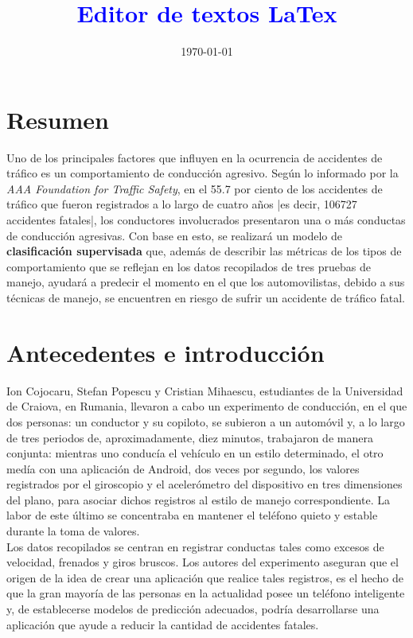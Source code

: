 \documentclass[spanish,12pt,letterpaper]{article}
\title{\textcolor{blue}{Editor de textos LaTex}}
\date{\today}
\begin{document}
\tableofcontents
\listoffigures
\listoftables

\newpage

\section{Resumen}

\textsc Uno de los principales factores que influyen en la ocurrencia de accidentes de tráfico es un comportamiento de conducción agresivo. Según lo informado por la \textit{AAA Foundation for Traffic Safety}, en el 55.7 por ciento de los accidentes de tráfico que fueron registrados a lo largo de cuatro años |es decir, 106727 accidentes fatales|, los conductores involucrados presentaron una o más conductas de conducción agresivas. Con base en esto, se realizará un modelo de \textbf{clasificación supervisada} que, además de describir las métricas de los tipos de comportamiento que se reflejan en los datos recopilados de tres pruebas de manejo, ayudará a predecir el momento en el que los automovilistas, debido a sus técnicas de manejo, se encuentren en riesgo de sufrir un accidente de tráfico fatal. \\

\section{Antecedentes e introducción}

\textsc Ion Cojocaru, Stefan Popescu y Cristian Mihaescu, estudiantes de la Universidad de Craiova, en Rumania, llevaron a cabo un experimento de conducción, en el que dos personas: un conductor y su copiloto, se subieron a un automóvil y, a lo largo de tres periodos de, aproximadamente, diez minutos, trabajaron de manera conjunta: mientras uno conducía el vehículo en un estilo determinado, el otro medía con una aplicación de Android, dos veces por segundo, los valores registrados por el giroscopio y el acelerómetro del dispositivo en tres dimensiones del plano, para asociar dichos registros al estilo de manejo correspondiente. La labor de este último se concentraba en mantener el teléfono quieto y estable durante la toma de valores.\\

\textsc Los datos recopilados se centran en registrar conductas tales como excesos de velocidad, frenados y giros bruscos. Los autores del experimento aseguran que el origen de la idea de crear una aplicación que realice tales registros, es el hecho de que la gran mayoría de las personas en la actualidad posee un teléfono inteligente y, de establecerse modelos de predicción adecuados, podría desarrollarse una aplicación que ayude a reducir la cantidad de accidentes fatales. \\
\end{document}

